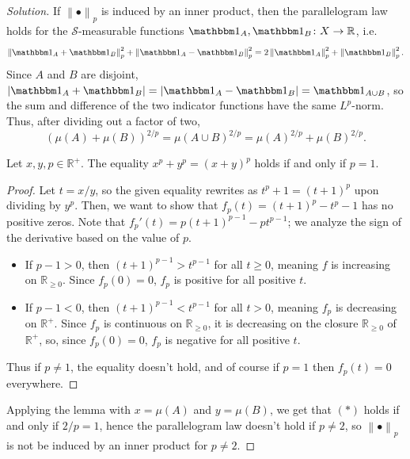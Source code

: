 \documentclass[10pt]{article}
\providecommand{\RR}{\mathbb R}
\providecommand{\ind}{\mathbbm 1}
\providecommand{\ii}{\item}
\newenvironment{soln}{\begin{proof}[Solution]}{\end{proof}}
\providecommand{\abs}[1]{\left\lvert #1\right\rvert}
\providecommand{\norm}[1]{\left\| #1\right\|}
\begin{document}
\begin{soln}
    If $\norm{\bullet}_p$ is induced by an inner product,
    then the parallelogram law holds for the $\mathcal S$-measurable functions
    $\ind_A,\ind_B\colon X\to\RR$, i.e.
    \begin{equation*}
	\norm{\ind_A + \ind_B}_p^2 + \norm{\ind_A - \ind_B}_p^2
	= 2\norm{\ind_A}_p^2 + \norm{\ind_B}_p^2.
    \end{equation*}
    Since $A$ and $B$ are disjoint,
    $\abs{\ind_A + \ind_B} = \abs{\ind_A - \ind_B} = \ind_{A\cup B}$,
    so the sum and difference of the two indicator functions
    have the same $L^p$-norm. Thus, after dividing out a factor of two,
    \begin{equation*}
	(\mu(A) + \mu(B))^{2/p} = \mu(A\cup B)^{2/p}
	= \mu(A)^{2/p} + \mu(B)^{2/p}.\tag{$\ast$}
    \end{equation*}

    \begin{lemma}
        \label{lem:nonadditivity}
        Let $x,y,p\in\RR^+$. The equality $x^p + y^p = (x + y)^p$ holds
	if and only if $p = 1$.
    \end{lemma}
    \begin{proof}
        Let $t = x/y$, so the given equality rewrites as
	$t^p + 1 = (t+1)^p$ upon dividing by $y^p$.
	Then, we want to show that $f_p(t) = (t+1)^p - t^p - 1$
	has no positive zeros. Note that $f_p'(t) = p(t+1)^{p-1} - pt^{p-1}$;
	we analyze the sign of the derivative based on the value of $p$.
	\begin{itemize}
	    \ii If $p-1 > 0$, then $(t+1)^{p-1} > t^{p-1}$ for all $t\ge 0$,
	    meaning $f$ is increasing on $\RR_{\ge0}$.
	    Since $f_p(0) = 0$, $f_p$ is positive for all positive $t$.
	    \ii If $p-1 < 0$, then $(t+1)^{p-1} < t^{p-1}$ for all $t > 0$,
	    meaning $f_p$ is decreasing on $\RR^+$.
	    Since $f_p$ is continuous on $\RR_{\ge0}$, it is
	    decreasing on the closure $\RR_{\ge0}$ of $\RR^+$,
	    so, since $f_p(0) = 0$, $f_p$ is negative for all positive $t$.
	\end{itemize}
	Thus if $p\ne 1$, the equality doesn't hold,
	and of course if $p = 1$ then $f_p(t) = 0$ everywhere.
    \end{proof}

    Applying the lemma with $x = \mu(A)$ and $y = \mu(B)$,
    we get that $(\ast)$ holds if and only if $2/p = 1$, hence
    the parallelogram law doesn't hold if $p \ne 2$,
    so $\norm{\bullet}_p$ is not be induced by an inner product for $p\ne 2$.
\end{soln}
\end{document}
